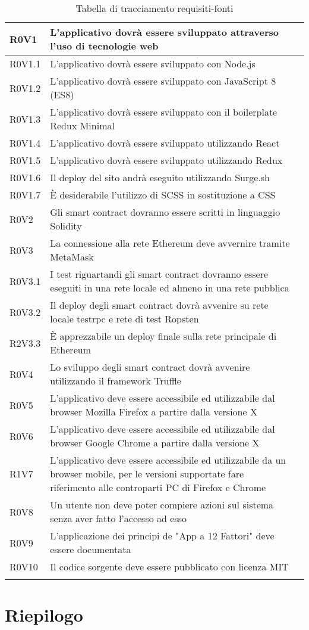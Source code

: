 \documentclass[AnalisiDeiRequisiti.tex]{subfiles}
\begin{document}
\begin{longtable}[H]{|p{2cm}|p{5cm}|p{5cm}|}
	R0V1 &  L'applicativo dovrà essere sviluppato attraverso l'uso di tecnologie web &  \\ \hline
	R0V1.1 &  L'applicativo dovrà essere sviluppato con Node.js &  \\ \hline
	R0V1.2 &  L'applicativo dovrà essere sviluppato con JavaScript 8 (ES8) &  \\ \hline
	R0V1.3 &  L'applicativo dovrà essere sviluppato con il boilerplate Redux Minimal &  \\ \hline
	R0V1.4 &  L'applicativo dovrà essere sviluppato utilizzando React &  \\ \hline
	R0V1.5 &  L'applicativo dovrà essere sviluppato utilizzando Redux &  \\ \hline
	R0V1.6 &  Il deploy del sito andrà eseguito utilizzando Surge.sh &  \\ \hline
	R0V1.7 &  È desiderabile l'utilizzo di SCSS in sostituzione a CSS &  \\ \hline
	R0V2 &  Gli smart contract dovranno essere scritti in linguaggio Solidity &  \\ \hline
	R0V3 &  La connessione alla rete Ethereum deve avvernire tramite MetaMask &  \\ \hline
	R0V3.1 &  I test riguartandi gli smart contract dovranno essere eseguiti in una rete locale ed almeno in una rete pubblica &  \\ \hline
	R0V3.2 &  Il deploy degli smart contract dovrà avvenire su rete locale testrpc e rete di test Ropsten &  \\ \hline
	R2V3.3 &  È apprezzabile un deploy finale sulla rete principale di Ethereum &  \\ \hline
	R0V4 &  Lo sviluppo degli smart contract dovrà avvenire utilizzando il framework Truffle &  \\ \hline
	R0V5 &  L'applicativo deve essere accessibile ed utilizzabile dal browser Mozilla Firefox a partire dalla versione X &  \\ \hline
	R0V6 &  L'applicativo deve essere accessibile ed utilizzabile dal browser Google Chrome a partire dalla versione X &  \\ \hline
	R1V7 &  L'applicativo deve essere accessibile ed utilizzabile da un browser mobile, per le versioni supportate fare riferimento alle controparti PC di Firefox e Chrome &  \\ \hline
	R0V8 &  Un utente non deve poter compiere azioni sul sistema senza aver fatto l'accesso ad esso &  \\ \hline
	R0V9 &  L'applicazione dei principi de "App a 12 Fattori" deve essere documentata &  \\ \hline
	R0V10 &  Il codice sorgente deve essere pubblicato con licenza MIT &  \\ \hline
	\caption{Tabella di tracciamento requisiti-fonti}
\end{longtable}

\section{Riepilogo}
\end{document}
